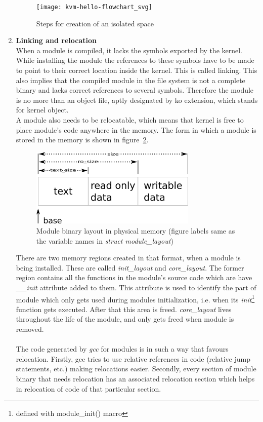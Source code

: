 \documentclass[twoside]{iitbreport}
\begin{document}
\begin{enumerate}
\begin{figure}[ht]
\centering
\texttt{[image: kvm-hello-flowchart\_svg]}
\caption{Steps for creation of an isolated space \label{fig:kvmHellowFlowchart1}}
\end{figure}


\item \textbf{Linking and relocation}\\
When a module is compiled, it lacks the symbols exported by the kernel. While installing the module the references to these symbols have to be made to point to their correct location inside the kernel. This is called linking. This also implies that the compiled module in the file system is not a complete binary and lacks correct references to several symbols. Therefore the module is no more than an object file, aptly designated by ko extension, which stands for kernel object.\\
A module also needs to be relocatable, which means that kernel is free to place module's code anywhere in the memory. The form in which a module is stored in the memory is shown in figure~\ref{fig:binaryLayout1}.\\

\begin{figure}[ht]
\centering
\includegraphics[width=0.75\textwidth]{module-binary_svg}
\caption{Module binary layout in physical memory (figure labels same as the variable names in \textit{struct module\_layout}) \label{fig:binaryLayout1}}
\end{figure}

There are two memory regions created in that format, when a module is being installed. These are called \textit{init\_layout} and \textit{core\_layout}. The former region contains all the functions in the module's source code which are have  \textit{\_\_init} attribute added to them. This attribute is used to identify the part of module which only gets used during modules initialization, i.e. when its \textit{init}\footnote{defined with module\_init() macro} function gets executed. After that this area is freed. \textit{core\_layout} lives throughout the life of the module, and only gets freed when module is removed.
\\\\
The code generated by \textit{gcc} for modules is in such a way that favours relocation. Firstly, gcc tries to use relative references in code (relative jump statements, etc.) making relocations easier. Secondly, every section of module binary that needs relocation has an associated relocation section which helps in relocation of code of that particular section.


\end{enumerate}
\end{document}
